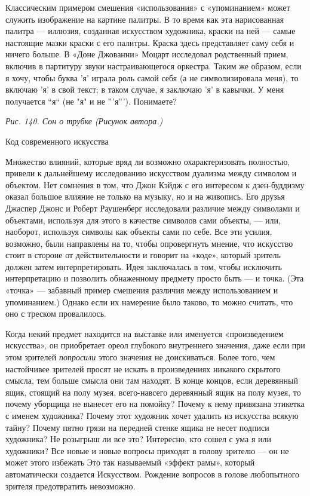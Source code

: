 \documentclass[../main.tex]{subfiles}
\begin{document}
Классическим примером смешения «использования» с «упоминанием» может служить изображение на картине палитры. В то время как эта нарисованная палитра --- иллюзия, созданная искусством художника, краски на ней --- самые настоящие мазки краски с его палитры. Краска здесь представляет саму себя и ничего больше. В «Доне Джованни» Моцарт исследовал родственный прием, включив в партитуру звуки настраивающегося оркестра. Таким же образом, если я хочу, чтобы буква 'я' играла роль самой себя (а не символизировала меня), то включаю 'я' в свой текст; в таком случае, я заключаю 'я' в кавычки. У меня получается ``я`` (не "я" и не '''я'''). Понимаете?

\emph{Рис. 140. Сон о трубке (Рисунок автора.)}

Код современного искусства

Множество влияний, которые вряд ли возможно охарактеризовать полностью, привели к дальнейшему исследованию искусством дуализма между символом и объектом. Нет сомнения в том, что Джон Кэйдж с его интересом к дзен-буддизму оказал большое влияние не только на музыку, но и на живопись. Его друзья Джаспер Джонс и Роберт Раушенберг исследовали различие между символами и объектами, используя для этого в качестве символов сами объекты, --- или, наоборот, используя символы как объекты сами по себе. Все эти усилия, возможно, были направлены на то, чтобы опровергнуть мнение, что искусство стоит в стороне от действительности и говорит на «коде», который зритель должен затем интерпретировать. Идея заключалась в том, чтобы исключить интерпретацию и позволить обнаженному предмету просто быть --- и точка. (Эта «точка» --- забавный пример смешения различия между использованием и упоминанием.) Однако если их намерение было таково, то можно считать, что оно с треском провалилось.

Когда некий предмет находится на выставке или именуется «произведением искусства», он приобретает ореол глубокого внутреннего значения, даже если при этом зрителей \emph{попросили} этого значения не доискиваться. Более того, чем настойчивее зрителей просят не искать в произведениях никакого скрытого смысла, тем больше смысла они там находят. В конце концов, если деревянный ящик, стоящий на полу музея, всего-навсего деревянный ящик на полу музея, то почему уборщица не вынесет его на помойку? Почему к нему привязана этикетка с именем художника? Почему этот художник хочет удалить из искусства всякую тайну? Почему пятно грязи на передней стенке ящика не несет подписи художника? Не розыгрыш ли все это? Интересно, кто сошел с ума я или художники? Все новые и новые вопросы приходят в голову зрителю --- он не может этого избежать Это так называемый «эффект рамы», который автоматически создается Искусством. Рождение вопросов в голове любопытного зрителя предотвратить невозможно.
\end{document}
